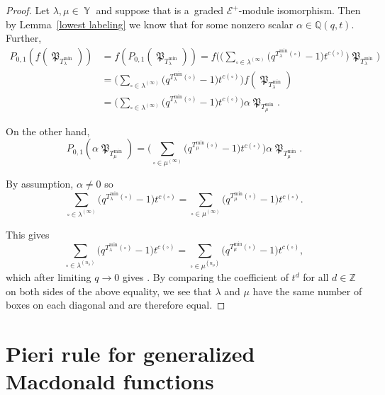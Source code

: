 \documentclass[pdftex]{sigma}
\numberwithin{equation}{section}
\theoremstyle{definition}
\DeclareMathOperator{\Par}{\mathbb{Y}}
\DeclareMathOperator{\MacD}{\mathfrak{P}}
\begin{document}
\begin{proof}
 Let $\lambda, \mu \in \Par$ and suppose that  is a~graded $\mathcal{E}^{+}$-module isomorphism. Then by Lemma~\ref{lowest labeling} we know that
 \smash{$
 f(\MacD_{T^{\min}_{\lambda}}) = \alpha \MacD_{T^{\min}_{\mu}}
$}
 for some nonzero scalar $\alpha \in \mathbb{Q}(q,t)$. Further,
 \begin{align*}
 P_{0,1}(f(\MacD_{T^{\min}_{\lambda}})) &= f(P_{0,1}(\MacD_{T^{\min}_{\lambda}}))
 = f\biggl(\biggl(\sum_{\square\in \lambda^{(\infty)}}\bigl(q^{T^{\min}_{\lambda}(\square)}-1\bigr)t^{c(\square)}\biggr)\MacD_{T^{\min}_{\lambda}}\biggr) \\
 & = \biggl(\sum_{\square\in \lambda^{(\infty)}}\bigl(q^{T^{\min}_{\lambda}(\square)}-1\bigr)t^{c(\square)}\biggr)f(\MacD_{T^{\min}_{\lambda}}) \\
 & = \biggl(\sum_{\square\in \lambda^{(\infty)}}\bigl(q^{T^{\min}_{\lambda}(\square)}-1\bigr)t^{c(\square)}\biggr) \alpha \MacD_{T^{\min}_{\mu}}.
 \end{align*}

 On the other hand,
 \[
 P_{0,1}(\alpha \MacD_{T^{\min}_{\mu}}) = \biggl(\sum_{\square\in \mu^{(\infty)}}\bigl(q^{T^{\min}_{\mu}(\square)}-1\bigr)t^{c(\square)}\biggr)\alpha \MacD_{T^{\min}_{\mu}}.
 \]

 By assumption, $\alpha \neq 0$ so
 \[
 \sum_{\square\in \lambda^{(\infty)}}\bigl(q^{T^{\min}_{\lambda}(\square)}-1\bigr)t^{c(\square)} = \sum_{\square\in \mu^{(\infty)}}\bigl(q^{T^{\min}_{\mu}(\square)}-1\bigr)t^{c(\square)}.
 \]


 This gives
 \[
 \sum_{\square\in \lambda^{(n_{\lambda})}}\bigl(q^{T^{\min}_{\lambda}(\square)}-1\bigr)t^{c(\square)} = \sum_{\square\in \mu^{(n_{\mu})}}\bigl(q^{T^{\min}_{\mu}(\square)}-1\bigr)t^{c(\square)},
 \]
 which after limiting $q \rightarrow 0$ gives
.
 By comparing the coefficient of $t^d$ for all $d \in \mathbb{Z}$ on both sides of the above equality, we see that $\lambda$ and $\mu$ have the same number of boxes on each diagonal and are therefore equal.
\end{proof}

\section{Pieri rule for generalized Macdonald functions}\label{Pieri Rule section}
\end{document}
